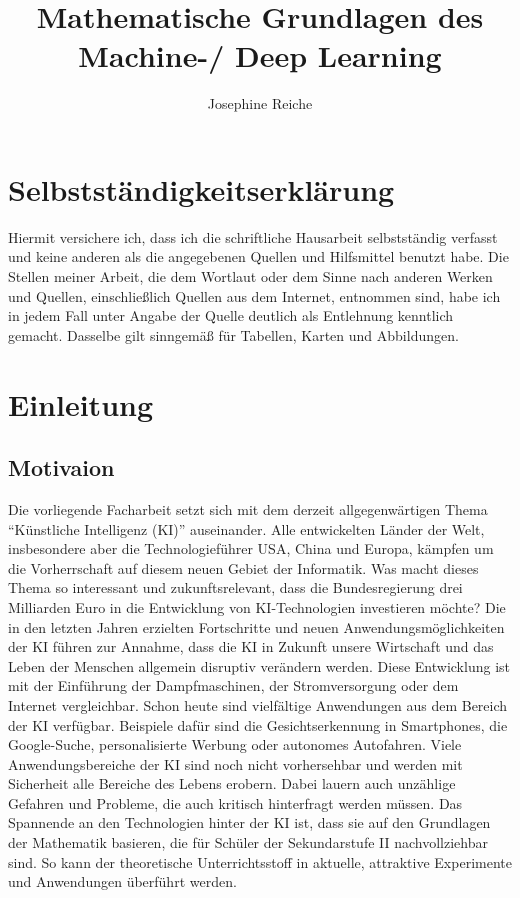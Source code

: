 \documentclass[a4paper]{scrreprt}
\begin{document}
\author{Josephine Reiche}
\title{Mathematische Grundlagen des Machine-/ Deep Learning}
\maketitle
\tableofcontents
\onehalfspacing
%
%
\chapter{Selbstständigkeitserklärung}
Hiermit versichere ich, dass ich die schriftliche Hausarbeit selbstständig verfasst und keine
anderen als die angegebenen Quellen und Hilfsmittel benutzt habe. Die Stellen meiner Arbeit,
die dem Wortlaut oder dem Sinne nach anderen Werken und Quellen, einschließlich Quellen
aus dem Internet, entnommen sind, habe ich in jedem Fall unter Angabe der Quelle deutlich
als Entlehnung kenntlich gemacht. Dasselbe gilt sinngemäß für Tabellen, Karten und
Abbildungen.
\chapter{Einleitung}
\section{Motivaion}
Die vorliegende Facharbeit setzt sich mit dem derzeit allgegenwärtigen Thema ``Künstliche Intelligenz (KI)'' auseinander. Alle entwickelten Länder der Welt, insbesondere aber die Technologieführer USA, China und Europa, kämpfen um die Vorherrschaft auf diesem neuen Gebiet der Informatik. Was macht dieses Thema so interessant und zukunftsrelevant, dass die Bundesregierung drei Milliarden Euro in die Entwicklung von KI-Technologien investieren möchte? Die in den letzten Jahren erzielten Fortschritte und neuen Anwendungsmöglichkeiten der KI führen zur Annahme, dass die KI in Zukunft unsere Wirtschaft und das Leben der Menschen allgemein disruptiv verändern werden. Diese Entwicklung ist mit der Einführung der Dampfmaschinen, der Stromversorgung oder dem Internet vergleichbar. Schon heute sind vielfältige Anwendungen aus dem Bereich der KI verfügbar. Beispiele dafür sind die Gesichtserkennung in Smartphones, die Google-Suche, personalisierte Werbung oder autonomes Autofahren. Viele Anwendungsbereiche der KI sind noch nicht vorhersehbar und werden mit Sicherheit alle Bereiche des Lebens erobern. Dabei lauern auch unzählige Gefahren und Probleme, die auch kritisch hinterfragt werden müssen. Das Spannende an den Technologien hinter der KI ist, dass sie auf den Grundlagen der Mathematik basieren, die für Schüler der Sekundarstufe II nachvollziehbar sind. So kann der theoretische Unterrichtsstoff in aktuelle, attraktive Experimente und Anwendungen überführt werden. 
\end{document}
